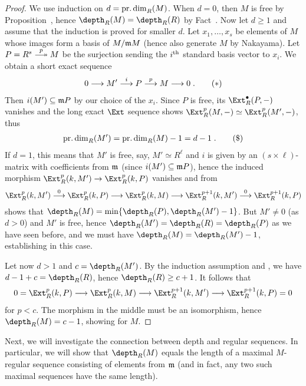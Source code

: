 \documentclass[a4paper,parskip=half,numbers=enddot, DIV=12]{scrreprt}
\begin{document}
\begin{proof}
	We use induction on $d=\operatorname{pr.dim}_R(M)$. When $d=0$, then $M$ is free by Proposition~, hence $\depth_R(M)=\depth_R(R)$ by Fact~. Now let $d\geq 1$ and assume that the induction is proved for smaller $d$. Let $x_1,\ldots,x_s$ be elements of $M$ whose images form a basis of $M/\mathfrak{m} M$ (hence also generate $M$ by Nakayama). Let $P=R^s\epimorphism[p] M$ be the surjection sending the $i^{\text{th}}$ standard basis vector to $x_i$. We obtain a short exact sequence
	\begin{align}\lbl{eq:exactSeq1}
		0\morphism M'\morphism[i] P\morphism[p] M\morphism 0\;.\tag{$*$}
	\end{align}
	Then $i(M')\subseteq \mathfrak{m} P$ by our choice of the $x_i$. Since $P$ is free, its $\Ext_R^\bullet(P,-)$ vanishes and the long exact $\Ext$ sequence shows $\Ext_R^p(M,-)\simeq \Ext_R^p(M',-)$, thus 
	\begin{align}\lbl{eq:depthInduction}
		\pdim_R(M')=\pdim_R(M)-1=d-1\;.\tag{\$}
	\end{align}
	If $d=1$, this means that $M'$ is free, say, $M'\simeq R^\ell$ and $i$ is given by an $(s\times \ell)$-matrix with coefficients from $\mathfrak{m}$ (since $i(M')\subseteq \mathfrak{m} P$), hence the induced morphism $\Ext_R^p(k,M')\morphism\Ext_R^p(k,P)$ vanishes and from
	\begin{align*}
		\Ext_R^p(k,M')\morphism[0]\Ext_R^p(k,P)\morphism\Ext_R^p(k,M)\morphism\Ext_R^{p+1}(k,M')\morphism[0]\Ext_R^{p+1}(k,P)
	\end{align*}
	shows that $\depth_R(M)=\min\{\depth_R(P),\depth_R(M')-1\}$. But $M'\neq 0$ (as $d>0$) and $M'$ is free, hence $\depth_R(M')=\depth_R(R)=\depth_R(P)$ as we have seen before, and we must have $\depth_R(M)=\depth_R(M')-1$, establishing  in this case.
	
	Let now $d>1$ and $c=\depth_R(M')$. By the induction assumption and , we have $d-1+c=\depth_R(R)$, hence $\depth_R(R)\geq c+1$. It follows that
	\begin{align*}
		0=\Ext_R^p(k,P)\morphism\Ext_R^p(k,M)\morphism\Ext_R^{p+1}(k,M')\morphism\Ext_R^{p+1}(k,P)=0
	\end{align*}
	for $p<c$. The morphism in the middle must be an isomorphism, hence $\depth_R(M)=c-1$, showing  for $M$.
\end{proof}
Next, we will investigate the connection between depth and regular sequences. In particular, we will show that $\depth_R(M)$ equals the length of a maximal $M$-regular sequence consisting of elements from $\mathfrak{m}$ (and in fact, any two such maximal sequences have the same length).
\end{document}
